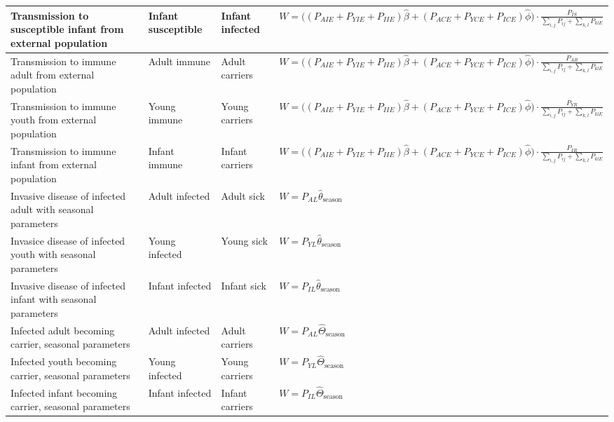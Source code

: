 \documentclass[10pt,a4paper]{article}
\begin{document}
\begin{appendices}
\begin{longtable}{p{3.5cm}|l|l|p{4cm}}
																																									\\ \hline	
	Transmission to susceptible infant from external population	& Infant susceptible	& Infant infected	&
				$W = \big( \left( P_{AIE} + P_{YIE} + P_{IIE}\right) \hat{\beta} + \left( P_{ACE} + P_{YCE} + P_{ICE} \right) \hat{\phi} \big) \cdot \frac{P_{IS}}{\sum_{i,j}P_{ij} + \sum_{k,l} P_{klE}}$
																																									\\ \hline
	Transmission to immune adult from external population			& Adult immune			& Adult carriers	&
				$W = \big( \left( P_{AIE} + P_{YIE} + P_{IIE}\right) \hat{\beta} + \left( P_{ACE} + P_{YCE} + P_{ICE} \right) \hat{\phi} \big) \cdot \frac{P_{AR}}{\sum_{i,j} P_{ij} + \sum_{k,l} P_{klE}}$
																																									\\ \hline
	Transmission to immune youth from external population			& Young immune			& Young carriers	&
				$W = \big( \left( P_{AIE} + P_{YIE} + P_{IIE}\right) \hat{\beta} + \left( P_{ACE} + P_{YCE} + P_{ICE} \right) \hat{\phi} \big) \cdot \frac{P_{YR}}{\sum_{i,j} P_{ij} + \sum_{k,l} P_{klE}}$
																																									\\ \hline
	Transmission to immune infant from external population			& Infant immune			& Infant carriers	&
				$W = \big( \left( P_{AIE} + P_{YIE} + P_{IIE}\right) \hat{\beta} + \left( P_{ACE} + P_{YCE} + P_{ICE} \right) \hat{\phi} \big) \cdot \frac{P_{IR}}{\sum_{i,j} P_{ij} + \sum_{k,l} P_{klE}}$
																																									\\ \hline
	Invasive disease of infected adult with seasonal parameters	& Adult infected		& Adult sick		& $ W = P_{AL} \hat{\theta}_{\textrm{season}} $	\\ \hline
	Invasice disease of infected youth with seasonal parameters	& Young infected		& Young sick		& $ W = P_{YL} \hat{\theta}_{\textrm{season}} $	\\ \hline
	Invasive disease of infected infant with seasonal parameters	& Infant infected		& Infant sick		& $ W = P_{IL} \hat{\theta}_{\textrm{season}} $	\\ \hline
	Infected adult becoming carrier, seasonal parameters			& Adult infected		& Adult carriers	& $ W = P_{AL} \hat{\Theta}_{\textrm{season}} $	\\ \hline
	Infected youth becoming carrier, seasonal parameters			& Young infected		& Young carriers	& $ W = P_{YL} \hat{\Theta}_{\textrm{season}} $	\\ \hline
	Infected infant becoming carrier, seasonal parameters			& Infant infected		& Infant carriers	& $ W = P_{IL} \hat{\Theta}_{\textrm{season}} $	\\ \hline


\end{longtable}
\end{appendices}
\end{document}
